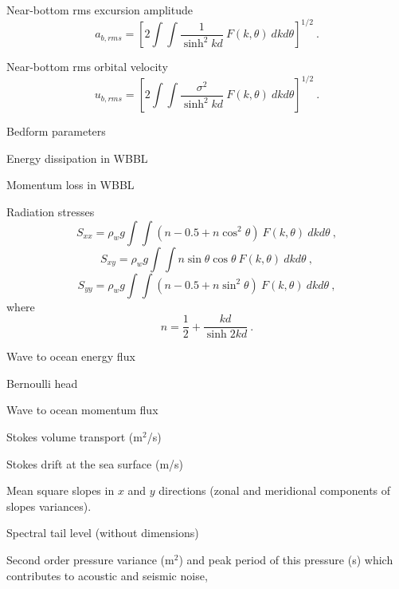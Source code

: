 \begin{list}{)\hfill}
\item Near-bottom rms excursion amplitude
      \begin{equation} a_{b,rms} = \left [ 2 \int \!\!\!\! \int
      \frac{1}{\sinh^2 kd} \: F(k,\theta) \: dk d\theta \right ] ^{1/2}
      \: . \label{eq:ab_rms} \end{equation}
\item Near-bottom rms orbital velocity
      \begin{equation} u_{b,rms} = \left [ 2 \int \!\!\!\! \int
      \frac{\sigma^2}{\sinh^2 kd} \: F(k,\theta) \: dk d\theta \right ] ^{1/2}
      \: . \label{eq:ub_rms} \end{equation}
\item Bedform parameters  
\item Energy dissipation in WBBL 
\item Momentum loss in WBBL 
\item Radiation stresses
      \begin{equation} S_{xx} = \rho_w g \int \!\!\!\! \int \left
        ( n - 0.5 + n \cos^2 \theta \right )  \: F(k,\theta) \: dk d\theta
      \: , \label{eq:Sxx} \end{equation}
      \begin{equation} S_{xy} =\rho_w g \int \!\!\!\! \int
        n \sin \theta \cos \theta  \: F(k,\theta) \: dk d\theta
      \: , \label{eq:Syy} \end{equation}
      \begin{equation} S_{yy} =\rho_w g \int \!\!\!\! \int \left
        ( n - 0.5 + n \sin^2 \theta \right )  \: F(k,\theta) \: dk d\theta
      \: , \label{eq:Sxy} \end{equation}
      where
      \begin{equation} n = \frac{1}{2} + \frac{kd}{\sinh 2kd}
      \: . \label{eq:n} \end{equation}
\item Wave to ocean energy flux
\item Bernoulli head
\item Wave to ocean momentum flux
\item Stokes volume transport (m$^2$/s)
\item Stokes drift at the sea surface (m/s)
\item Mean square slopes in $x$ and $y$ directions (zonal and meridional components of slopes variances). 
\item Spectral tail level (without dimensions) 
\item Second order pressure variance (m$^2$) and peak period of this pressure (s) which contributes to acoustic and seismic noise, 

\end{list}
